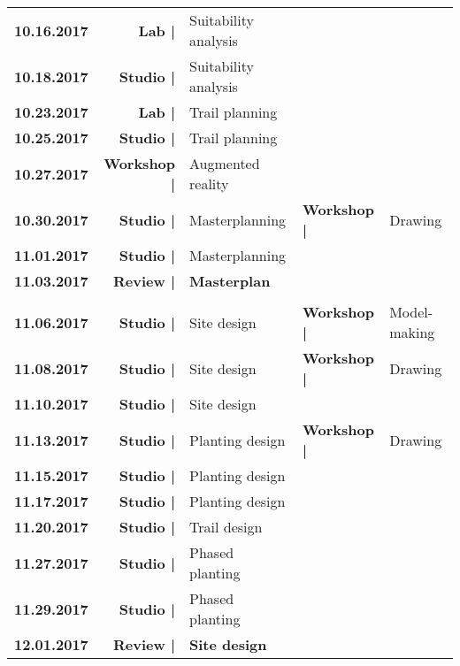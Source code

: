 \documentclass[11pt,article,oneside]{memoir}
\begin{document}
\begin{table}[H]
\begin{tabular}{l @{\hskip 0.75cm} r @{\hskip 0.1cm} l @{\hskip 1cm} l @{\hskip 0.1cm} l }
%
\textbf{10.16.2017} & \textbf{Lab |} & Suitability analysis\\
\textbf{10.18.2017} & \textbf{Studio |} & Suitability analysis\\
%
\textbf{10.23.2017} & \textbf{Lab |} & Trail planning\\
\textbf{10.25.2017} & \textbf{Studio |} & Trail planning\\
\textbf{10.27.2017} & \textbf{Workshop |} & Augmented reality\\
%
\textbf{10.30.2017} & \textbf{Studio |} & Masterplanning & \textbf{Workshop |} & Drawing\\
\textbf{11.01.2017} & \textbf{Studio |} & Masterplanning\\
\textbf{11.03.2017} & \textbf{Review |} & \textbf{Masterplan}\\
%
\\
%
\textbf{11.06.2017} & \textbf{Studio |} & Site design & \textbf{Workshop |} & Model-making\\
\textbf{11.08.2017} & \textbf{Studio |} & Site design & \textbf{Workshop |} & Drawing\\
\textbf{11.10.2017} & \textbf{Studio |} & Site design\\
%
\textbf{11.13.2017} & \textbf{Studio |} & Planting design & \textbf{Workshop |} & Drawing\\
\textbf{11.15.2017} & \textbf{Studio |} & Planting design\\
\textbf{11.17.2017} & \textbf{Studio |} & Planting design\\
%
\textbf{11.20.2017} & \textbf{Studio |} & Trail design\\ 
%
\textbf{11.27.2017} & \textbf{Studio |} & Phased planting\\
\textbf{11.29.2017} & \textbf{Studio |} & Phased planting\\
\textbf{12.01.2017} & \textbf{Review |} & \textbf{Site design}\\
%
\end{tabular}
\end{table}
\end{document}
